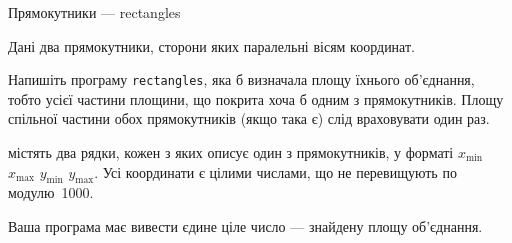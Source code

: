\documentclass[14pt,a4paper]{extarticle}
\begin{document}
\begin{problemAllDefault}{Прямокутники --- rectangles}

Дані два прямокутники, сторони яких паралельні вісям координат.

\Task Напишіть програму \texttt{rectangles}, яка б визначала площу їхнього об’єднання, тобто усієї частини площини, що покрита хоча б одним з прямокутників. Площу спільної частини обох прямокутників (якщо така є) слід враховувати один раз.

\InputFile містять два рядки, кожен з яких описує один з прямокутників, у форматі $x_{\min}$ $x_{\max}$ $y_{\min}$ $y_{\max}$. Усі координати є цілими числами, що не перевищують по модулю~1000.

\OutputFile Ваша програма має вивести єдине ціле число --- знайдену площу об’єднання.



\Examples

\begin{exampleSimple}{6em}{4em}%
%
%
\end{exampleSimple}
\begin{exampleSimple}{6em}{4em}%
%
\end{exampleSimple}
{}%



\end{problemAllDefault}
	
\end{document}
